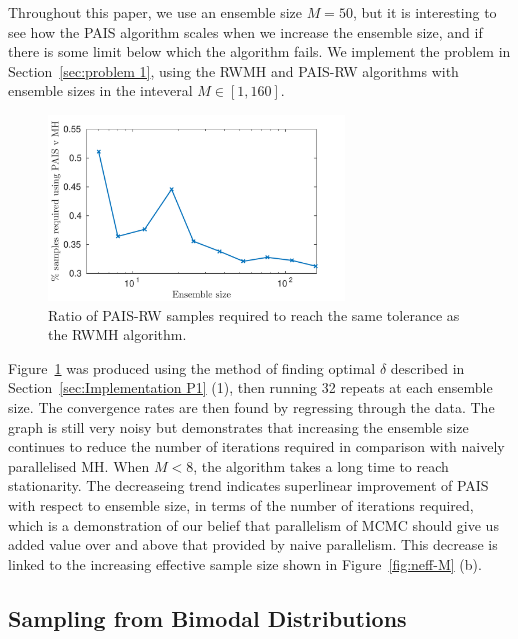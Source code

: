 \documentclass[final]{siamltex}
\begin{document}
Throughout this paper, we use an ensemble size $M=50$, but it is interesting to see how the PAIS algorithm scales when we increase the ensemble size, and if there is some limit below which the algorithm fails. We implement the problem in Section~\ref{sec:problem 1}, using the RWMH and PAIS-RW algorithms with ensemble sizes in the inteveral $M \in [1, 160]$.

\begin{figure}[h]
\begin{center}
\includegraphics[width=0.7\textwidth]{"figures/PAIS_saving"}
\caption{Ratio of PAIS-RW samples required to reach the same tolerance as the RWMH algorithm.}
\label{fig:PAIS_saving}
\end{center}
\end{figure}

Figure~\ref{fig:PAIS_saving} was produced using the method of finding
optimal $\delta$ described in Section~\ref{sec:Implementation P1} (1),
then running 32 repeats at each ensemble size. The convergence rates
are then found by regressing through the data. The graph is still very
noisy but demonstrates that increasing the ensemble size continues to
reduce the number of iterations required in comparison with naively parallelised MH. When $M<8$, the algorithm takes a long time to reach
stationarity. The decreaseing trend indicates superlinear improvement of PAIS with
respect to ensemble size, in terms of the number of iterations
required, which is a demonstration of our belief that parallelism of
MCMC should give us added value over and above that provided by naive parallelism. This decrease is linked to the increasing effective sample size shown in Figure~\ref{fig:neff-M} (b).

\subsection{Sampling from Bimodal Distributions}
\end{document}
